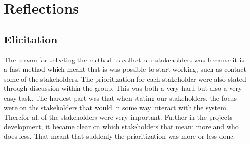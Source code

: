 \documentclass[10pt,a4paper]{article}
\begin{document}


\section{Reflections}

\subsection{Elicitation}
The reason for selecting the method to collect our stakeholders was because it is a fast method which meant that is was possible to start working, such as contact some of the stakeholders. The prioritization for each stakeholder were also stated through discussion within the group. This was both a very hard but also a very easy task. The hardest part was that when stating our stakeholders, the focus were on the stakeholders that would in some way interact with the system. Therefor all of the stakeholders were very important. Further in the projects development, it became clear on which stakeholders that meant more and who does less. That meant that suddenly the prioritization was more or less done. 
\end{document}
